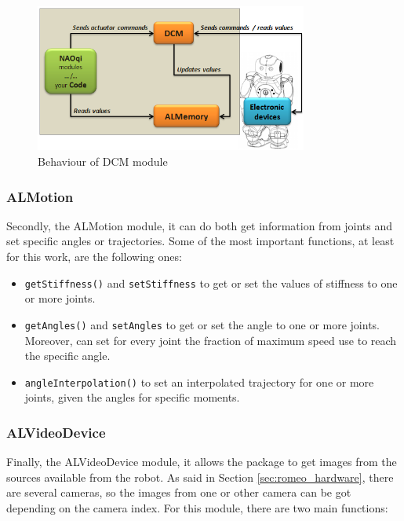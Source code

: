 \documentclass[12pt,a4paper,final,twoside,openright]{report}
\begin{document}
\begin{figure}[h]
\centering
\includegraphics[width=0.8\textwidth]{images/dcm_overview.png}
\caption{Behaviour of DCM module \cite{Aldebaran}\label{fig:naoqi_DCM}}
\end{figure}

\subsubsection{ALMotion}

Secondly, the ALMotion module, it can do both get information from joints and set specific angles or trajectories. Some of the most important functions, at least for this work, are the following ones:

\begin{itemize}
\item \texttt{getStiffness()} and \texttt{setStiffness} to get or set the values of stiffness to one or more joints.
\item \texttt{getAngles()} and \texttt{setAngles} to get or set the angle to one or more joints. Moreover, can set for every joint the fraction of maximum speed use to reach the specific angle.
\item \texttt{angleInterpolation()} to set an interpolated trajectory for one or more joints, given the angles for specific moments. 
\end{itemize}

\subsubsection{ALVideoDevice}

Finally, the ALVideoDevice module, it allows the package to get images from the sources available from the robot. As said in Section \ref{sec:romeo_hardware}, there are several cameras, so the images from one or other camera can be got depending on the camera index. For this module, there are two main functions:
\end{document}
